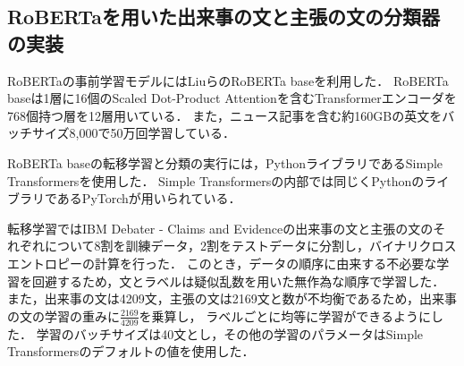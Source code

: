 \documentclass[12pt,a4j,dvipdfmx]{jreport}
\begin{document}


\subsection{RoBERTaを用いた出来事の文と主張の文の分類器の実装}
RoBERTaの事前学習モデルにはLiuらのRoBERTa baseを利用した\cite{liu_roberta_2019}．
RoBERTa baseは1層に16個のScaled Dot-Product Attentionを含むTransformerエンコーダを768個持つ層を12層用いている．
また，ニュース記事を含む約160GBの英文をバッチサイズ8,000で50万回学習している．


RoBERTa baseの転移学習と分類の実行には，PythonライブラリであるSimple Transformersを使用した．
Simple Transformersの内部では同じくPythonのライブラリであるPyTorchが用いられている．

転移学習ではIBM Debater - Claims and Evidenceの出来事の文と主張の文のそれぞれについて8割を訓練データ，2割をテストデータに分割し，バイナリクロスエントロピーの計算を行った．
このとき，データの順序に由来する不必要な学習を回避するため，文とラベルは疑似乱数を用いた無作為な順序で学習した\cite{aurellen20}．
また，出来事の文は4209文，主張の文は2169文と数が不均衡であるため，出来事の文の学習の重みに$\frac{2169}{4209}$を乗算し，
ラベルごとに均等に学習ができるようにした．
学習のバッチサイズは40文とし，その他の学習のパラメータはSimple Transformersのデフォルトの値を使用した．
\end{document}
